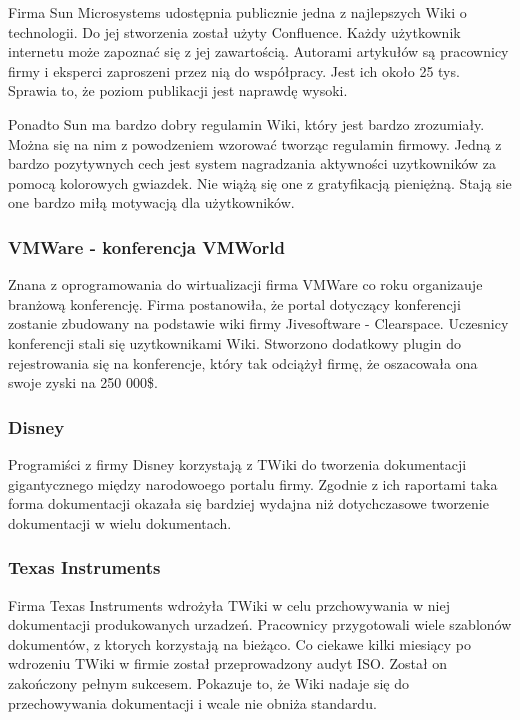 \documentclass{article}
\begin{document}
	Firma Sun Microsystems udostępnia publicznie jedna z najlepszych Wiki o technologii. Do jej stworzenia został użyty Confluence. Każdy użytkownik internetu może zapoznać się z jej zawartością. Autorami artykułów są pracownicy firmy i eksperci zaproszeni przez nią do współpracy. Jest ich około 25 tys. Sprawia to, że poziom publikacji jest naprawdę wysoki.

	Ponadto Sun ma bardzo dobry regulamin Wiki, który jest bardzo zrozumiały. Można się na nim z powodzeniem wzorować tworząc regulamin firmowy. Jedną z bardzo pozytywnych cech jest system nagradzania aktywności uzytkowników za pomocą kolorowych gwiazdek. Nie wiążą się one z gratyfikacją pieniężną. Stają sie one bardzo miłą motywacją dla użytkowników.


\subsubsection{VMWare - konferencja VMWorld} %
		
Znana z oprogramowania do wirtualizacji firma VMWare co roku organizauje branżową konferencję. Firma postanowiła, że portal dotyczący konferencji zostanie zbudowany na podstawie wiki firmy Jivesoftware - Clearspace. Uczesnicy konferencji stali się uzytkownikami Wiki. Stworzono dodatkowy plugin do rejestrowania się na konferencje, który tak odciążył firmę, że oszacowała ona swoje zyski na 250 000\$.



\subsubsection{Disney}

Programiści z firmy Disney korzystają z TWiki do tworzenia dokumentacji gigantycznego między narodowoego portalu firmy. Zgodnie z ich raportami taka forma dokumentacji okazała się bardziej wydajna niż dotychczasowe tworzenie dokumentacji w wielu dokumentach.


\subsubsection{Texas Instruments}

Firma Texas Instruments wdrożyła TWiki w celu przchowywania w niej dokumentacji produkowanych urzadzeń. Pracownicy przygotowali wiele szablonów dokumentów, z ktorych korzystają na bieżąco. Co ciekawe kilki miesiący po wdrozeniu TWiki w firmie został przeprowadzony audyt ISO. Został on zakończony pełnym sukcesem. Pokazuje to, że Wiki nadaje się do przechowywania dokumentacji i wcale nie obniża standardu.
\end{document}

